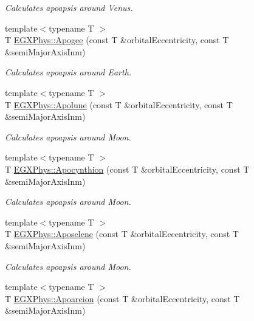 \begin{DoxyCompactItemize}
\begin{DoxyCompactList}\small\item\em Calculates apoapsis around Venus. \end{DoxyCompactList}\item 
{\footnotesize template$<$typename T $>$ }\\T \mbox{\hyperlink{group___e_g_x_phys-_apoapsis_ga5bb3b3a83de372ffaf9af3ab77d6f408}{E\+G\+X\+Phys\+::\+Apogee}} (const T \&orbital\+Eccentricity, const T \&semi\+Major\+Axis\+Inm)
\begin{DoxyCompactList}\small\item\em Calculates apoapsis around Earth. \end{DoxyCompactList}\item 
{\footnotesize template$<$typename T $>$ }\\T \mbox{\hyperlink{group___e_g_x_phys-_apoapsis_gac82e5aebcf63e5113ddefe648f40ef2e}{E\+G\+X\+Phys\+::\+Apolune}} (const T \&orbital\+Eccentricity, const T \&semi\+Major\+Axis\+Inm)
\begin{DoxyCompactList}\small\item\em Calculates apoapsis around Moon. \end{DoxyCompactList}\item 
{\footnotesize template$<$typename T $>$ }\\T \mbox{\hyperlink{group___e_g_x_phys-_apoapsis_ga44b6d3e3280b5a59e1cfb53b65673075}{E\+G\+X\+Phys\+::\+Apocynthion}} (const T \&orbital\+Eccentricity, const T \&semi\+Major\+Axis\+Inm)
\begin{DoxyCompactList}\small\item\em Calculates apoapsis around Moon. \end{DoxyCompactList}\item 
{\footnotesize template$<$typename T $>$ }\\T \mbox{\hyperlink{group___e_g_x_phys-_apoapsis_gaf13528a3ed48f6e85f4ba5735edc1163}{E\+G\+X\+Phys\+::\+Aposelene}} (const T \&orbital\+Eccentricity, const T \&semi\+Major\+Axis\+Inm)
\begin{DoxyCompactList}\small\item\em Calculates apoapsis around Moon. \end{DoxyCompactList}\item 
{\footnotesize template$<$typename T $>$ }\\T \mbox{\hyperlink{group___e_g_x_phys-_apoapsis_ga8a44d21df90f3e6e9168b871a5b7f26b}{E\+G\+X\+Phys\+::\+Apoareion}} (const T \&orbital\+Eccentricity, const T \&semi\+Major\+Axis\+Inm)

\end{DoxyCompactItemize}
